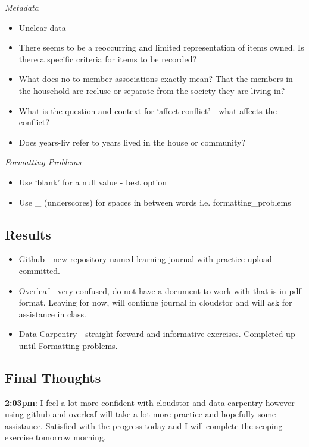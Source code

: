 \documentclass{article}
\begin{document}
\textit{Metadata }


\begin{itemize}
\item Unclear data
\item There seems to be a reoccurring and limited representation of items owned. Is there a specific criteria for items to be recorded?
\item What does no to member associations exactly mean? That the members in the household are recluse or separate from the society they are living in?
\item What is the question and context for ‘affect-conflict’ - what affects the conflict?
\item Does years-liv refer to years lived in the house or community?
\end{itemize}


\textit{Formatting Problems}

\begin{itemize}
\item Use ‘blank’ for a null value - best option
\item Use _ (underscores) for spaces in between words i.e. formatting_problems
\end{itemize}\subsection{Results}

\begin{itemize}
\item Github - new repository named learning-journal with practice upload committed. 
\item Overleaf - very confused, do not have a document to work with that is in pdf format. Leaving for now, will continue journal in cloudstor and will ask for assistance in class. 
\item Data Carpentry - straight forward and informative exercises. Completed up until Formatting problems.
\end{itemize}

\subsection{Final Thoughts}

\textbf{2:03pm}: I feel a lot more confident with cloudstor and data carpentry however using github and overleaf will take a lot more practice and hopefully some assistance. Satisfied with the progress today and I will complete the scoping exercise tomorrow morning.
\end{document}

